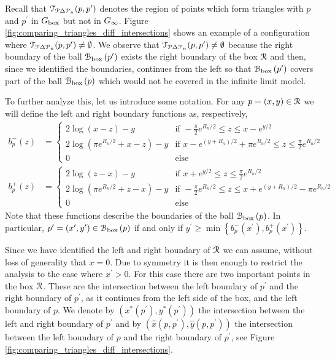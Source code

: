 Recall that $\mathcal{T}_{{\mathcal P} \Delta {\mathcal P}_n}(p,p^\prime)$ denotes the region of points which form triangles with $p$ and $p^\prime$ in $G_{\text{box}}$ but not in $G_{\infty}$. Figure \ref{fig:comparing_triangles_diff_intersections} shows an example of a configuration where $\mathcal{T}_{{\mathcal P} \Delta {\mathcal P}_n}(p,p^\prime) \ne \emptyset$. We observe that $\mathcal{T}_{{\mathcal P} \Delta {\mathcal P}_n}(p,p^\prime) \ne \emptyset$ because the right boundary of the ball ${\mathcal B}_{\text{box}}\left(p^\prime\right)$ exists the right boundary of the box ${\mathcal R}$ and then, since we identified the boundaries, continues from the left so that ${\mathcal B}_{\text{box}}\left(p^\prime\right)$ covers part of the ball ${\mathcal B}_{\text{box}}\left(p\right)$ which would not be covered in the infinite limit model. 

To further analyze this, let us introduce some notation. For any $p = (x,y) \in {\mathcal R}$ we will define the left and right boundary functions as, respectively,
\begin{align}
	b_p^-(z) &= \begin{cases}
		2 \log\left(x-z\right) - y &\mbox{if }  -\frac{\pi}{2} e^{R_n/2} \le z \le x - e^{y/2}  \\
		2\log\left(\pi e^{R_n/2} + x - z\right) - y 
			&\mbox{if } x - e^{(y + R_n)/2} + \pi e^{R_n/2} \le z \le \frac{\pi}{2} e^{R_n/2}\\
		0 &\mbox{else}
	\end{cases}\\
	b_p^+(z) &= \begin{cases}
		2 \log\left(z-x\right) - y &\mbox{if } x + e^{y/2} \le z \le \frac{\pi}{2} e^{R_n/2} \\
		2\log\left(\pi e^{R_n/2} + z - x\right) - y 
			&\mbox{if } -\frac{\pi}{2} e^{R_n/2} \le z \le x + e^{(y + R_n)/2} - \pi e^{R_n/2}\\
		0 &\mbox{else}
	\end{cases}
\end{align}
Note that these functions describe the boundaries of the ball ${\mathcal B}_{\text{box}}\left(p\right)$. In particular, $p^\prime = (x^\prime, y^\prime) \in {\mathcal B}_{\text{box}}\left(p\right)$ if and only if $y^\prime \ge \min\left\{b_p^-(x^\prime), b_p^+(x^\prime)\right\}$.

Since we have identified the left and right boundary of ${\mathcal R}$ we can assume, without loss of generality that $x = 0$. Due to symmetry it is then enough to restrict the analysis to the case where $x^\prime > 0$.  
For this case there are two important points in the box ${\mathcal R}$. These are the intersection between the left boundary of $p^\prime$ and the right boundary of $p^\prime$, as it continues from the left side of the box, and the left boundary of $p$. We denote by $(x^\ast(p^\prime), y^\ast(p^\prime))$ the intersection between the left and right boundary of $p^\prime$ and by $(\hat{x}(p,p^\prime), \hat{y}(p,p^\prime))$ the intersection between the left boundary of $p$ and the right boundary of $p^\prime$, see Figure \ref{fig:comparing_triangles_diff_intersections}. 

